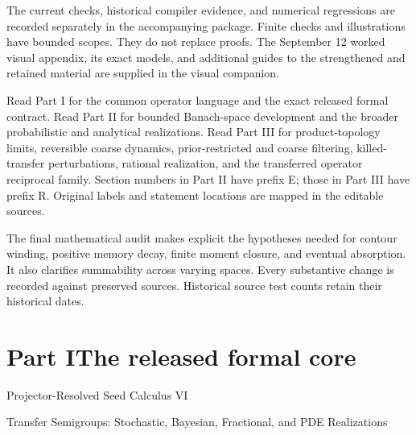 \documentclass[11pt,letterpaper]{article}
\theoremstyle{plain}
\theoremstyle{plain}
\theoremstyle{plain}
\theoremstyle{definition}
\theoremstyle{definition}
\theoremstyle{definition}
\theoremstyle{definition}
\theoremstyle{definition}
\theoremstyle{remark}
\theoremstyle{remark}
\theoremstyle{remark}
\theoremstyle{remark}
\theoremstyle{remark}
\theoremstyle{remark}
\begin{document}
The current checks, historical compiler evidence, and numerical regressions are recorded separately in the accompanying package. Finite checks and illustrations have bounded scopes. They do not replace proofs. The September 12 worked visual appendix, its exact models, and additional guides to the strengthened and retained material are supplied in the visual companion.

Read Part I for the common operator language and the exact released formal contract. Read Part II for bounded Banach-space development and the broader probabilistic and analytical realizations. Read Part III for product-topology limits, reversible coarse dynamics, prior-restricted and coarse filtering, killed-transfer perturbations, rational realization, and the transferred operator reciprocal family. Section numbers in Part II have prefix E; those in Part III have prefix R. Original labels and statement locations are mapped in the editable sources.

The final mathematical audit makes explicit the hypotheses needed for contour winding, positive memory decay, finite moment closure, and eventual absorption. It also clarifies summability across varying spaces. Every substantive change is recorded against preserved sources. Historical source test counts retain their historical dates.
\clearpage
\tableofcontents
\clearpage
\listoffigures
\listoftables
\clearpage
{}
\part*{Part I\quad The released formal core}
\begin{center}\large Projector-Resolved Seed Calculus VI\par\normalsize Transfer Semigroups: Stochastic, Bayesian, Fractional, and PDE Realizations\end{center}
\end{document}
